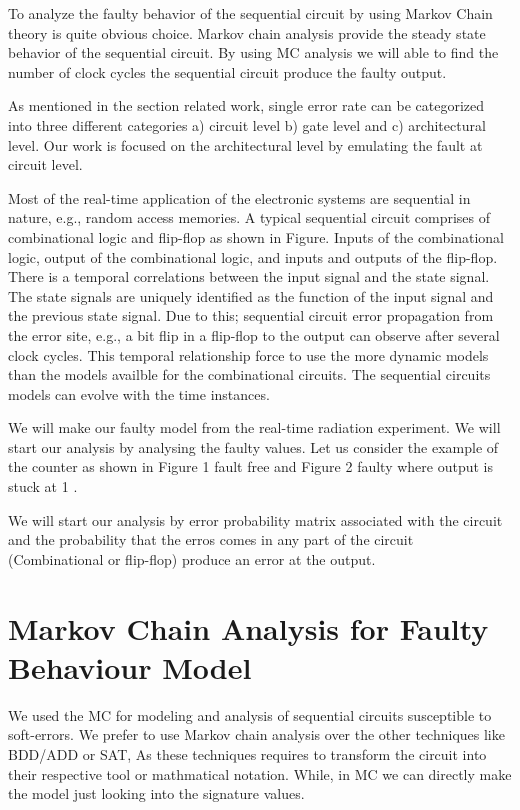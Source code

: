 To analyze the faulty behavior of the sequential circuit by using Markov Chain theory is quite obvious choice. Markov chain analysis provide the steady state behavior of the sequential circuit. By using MC analysis we will able to find the number of clock cycles the sequential circuit produce the faulty output.

As mentioned in the section related work, single error rate can be categorized into three different categories a)  circuit level b) gate level and c) architectural level.  Our work is focused on the architectural level by emulating the fault at circuit level. 




Most of the real-time application of the electronic systems are sequential in nature, e.g., random access memories. A typical sequential circuit comprises of combinational logic and flip-flop as shown in Figure.   Inputs of the combinational logic, output of the combinational logic, and inputs and outputs of the flip-flop. There is a temporal correlations between the input signal and the state signal. The state signals are uniquely identified as the function of the input signal and the previous state signal. Due to this; sequential circuit error propagation from the error site, e.g., a bit flip in a flip-flop to the output can observe after several clock cycles. This temporal relationship force to use the more dynamic models than the models availble for the combinational circuits. The sequential circuits models can evolve with the time instances.

We will make our faulty model from the real-time radiation experiment. We will start our analysis by analysing the faulty values. Let us consider the example of the counter as shown in Figure 1 fault free and Figure 2 faulty where output is stuck at 1 .  


We will start our analysis by error probability matrix associated with the circuit and the probability that the erros comes in any part of the circuit (Combinational or flip-flop) produce an error at the output. 





\section{Markov Chain Analysis for Faulty Behaviour Model}

   
We used the MC for modeling and analysis of sequential circuits susceptible to soft-errors. We prefer to use Markov chain analysis over the other techniques like BDD/ADD or SAT, As these techniques requires to transform the circuit into their respective tool or mathmatical notation. While, in MC we can directly make the model just looking into the signature values. 


